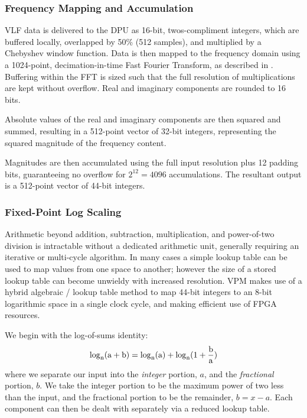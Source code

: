 \subsubsection{Frequency Mapping and Accumulation}
VLF data is delivered to the DPU as 16-bit, twos-compliment integers, which are buffered locally, overlapped by 50\% (512 samples), and multiplied by a Chebyshev window function. Data is then mapped to the frequency domain using a 1024-point, decimation-in-time Fast Fourier Transform, as described in \citep{Oppenheim_Schafer}. Buffering within the FFT is sized such that the full resolution of multiplications are kept without overflow. Real and imaginary components are rounded to 16 bits.

Absolute values of the real and imaginary components are then squared and summed, resulting in a 512-point vector of 32-bit integers, representing the squared magnitude of the frequency content.

Magnitudes are then accumulated using the full input resolution plus 12 padding bits, guaranteeing no overflow for $2^{12} = 4096 $ accumulations. The resultant output is a 512-point vector of 44-bit integers.

\subsubsection{Fixed-Point Log Scaling}
Arithmetic beyond addition, subtraction, multiplication, and power-of-two division is intractable without a dedicated arithmetic unit, generally requiring an iterative or multi-cycle algorithm. In many cases a simple lookup table can be used to map values from one space to another; however the size of a stored lookup table can become unwieldy with increased resolution. VPM makes use of a hybrid algebraic / lookup table method to map 44-bit integers to an 8-bit logarithmic space in a single clock cycle, and making efficient use of FPGA resources.

We begin with the log-of-sums identity:
\begin{equation}
\rm{log}_{n}(a + b) = \rm{log}_n (a) + \rm{log}_n(1 + \frac{b}{a})
\end{equation}
where we separate our input into the \emph{integer} portion, $a$, and the \emph{fractional} portion, $b$. We take the integer portion to be the maximum power of two less than the input, and the fractional portion to be the remainder, $b = x - a$. Each component can then be dealt with separately via a reduced lookup table.

